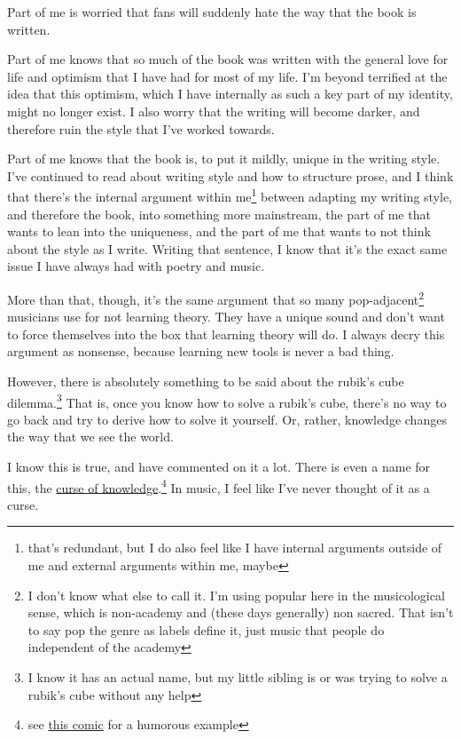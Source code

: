 \documentclass[12pt]{article}[titlepage]
\renewcommand{\,}{\textsuperscript{,}}
\begin{document}
Part of me is worried that fans will suddenly hate the way that the book is written.

Part of me knows that so much of the book was written with the general love for life and optimism that I have had for most of my life.  
I'm beyond terrified at the idea that this optimism, which I have internally as such a key part of my identity, might no longer exist.  
I also worry that the writing will become darker, and therefore ruin the style that I've worked towards.

Part of me knows that the book is, to put it mildly, unique in the writing style.  
I've continued to read about writing style and how to structure prose, and I think that there's the internal argument within me\footnote{that's redundant, but I do also feel like I have internal arguments outside of me and external arguments within me, maybe} between adapting my writing style, and therefore the book, into something more mainstream, the part of me that wants to lean into the uniqueness, and the part of me that wants to not think about the style as I write.  
Writing that sentence, I know that it's the exact same issue I have always had with poetry and music.

More than that, though, it's the same argument that so many pop-adjacent\footnote{I don't know what else to call it. I'm using popular here in the musicological sense, which is non-academy and (these days generally) non sacred. That isn't to say pop the genre as labels define it, just music that people do independent of the academy} musicians use for not learning theory.  
They have a unique sound and don't want to force themselves into the box that learning theory will do.  
I always decry this argument as nonsense, because learning new tools is never a bad thing.

However, there is absolutely something to be said about the rubik's cube dilemma.\footnote{I know it has an actual name, but my little sibling is or was trying to solve a rubik's cube without any help}  
That is, once you know how to solve a rubik's cube, there's no way to go back and try to derive how to solve it yourself.  
Or, rather, knowledge changes the way that we see the world.

I know this is true, and have commented on it a lot.  
There is even a name for this, the \href{https://psychology.stackexchange.com/questions/3801/what-is-the-name-of-the-cognitive-bias-where-an-expert-overestimates-the-knowled}{curse of knowledge}.\footnote{see \href{https://xkcd.com/2501/}{this comic} for a humorous example}
In music, I feel like I've never thought of it as a curse.
\end{document}
